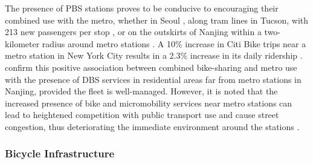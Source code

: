 \begin{refsegment}
The presence of \acrshort{PBS} stations proves to be conducive to encouraging their combined use with the metro, whether in Seoul \textcolor{blue}{\autocite[3111]{cho_estimation_2022}}, along tram lines in Tucson, with 213 new passengers per stop \textcolor{blue}{\autocite[14]{li_investigating_2022}}, or on the outskirts of Nanjing within a two-kilometer radius around metro stations \textcolor{blue}{\autocite[17]{ji_exploring_2018}}. A 10\% increase in Citi Bike trips near a metro station in New York City results in a 2.3\% increase in its daily ridership \textcolor{blue}{\autocite[932]{ashraf_impacts_2021}}. \textcolor{blue}{\textcite[13]{liu_use_2020}} confirm this positive association between combined bike-sharing and metro use with the presence of \acrshort{DBS} services in residential areas far from metro stations in Nanjing, provided the fleet is well-managed. However, it is noted that the increased presence of bike and micromobility services near metro stations can lead to heightened competition with public transport use \textcolor{blue}{\autocite[932]{ashraf_impacts_2021}} and cause street congestion, thus deteriorating the immediate environment around the stations \textcolor{blue}{\autocite[16]{chu_last_2021}}.%

\subsubsection*{Bicycle Infrastructure
    \label{chap2:amenagements-cyclables}
    }


\end{refsegment}
